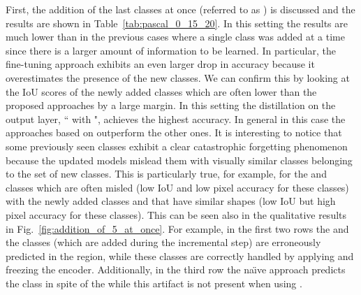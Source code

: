 \documentclass[10pt,twocolumn,letterpaper]{article}
\begin{document}
First, the addition of the last  classes at once (referred to as ) is discussed and the results are shown in Table~\ref{tab:pascal_0_15_20}. In this setting the results are much lower than in the previous cases where a single class was added at a time since there is a larger amount of information to be learned.
In particular, the fine-tuning approach exhibits an even larger drop in accuracy because it overestimates the presence of the new classes. We can confirm this by looking at the IoU scores of the newly added classes which are often lower than the proposed approaches by a large margin. In this setting the distillation on the output layer, `` with ", achieves the highest accuracy. In general in this case the approaches based on  outperform the other ones. It is interesting to notice that some previously seen classes exhibit a clear catastrophic forgetting phenomenon because the updated models mislead them with visually similar classes belonging to the set of new classes. This is particularly true, for example, for the  and  classes which are often misled (low IoU and low pixel accuracy for these classes) with the newly added classes  and  that have similar shapes (low IoU but high pixel accuracy for these classes). This can be seen also in the qualitative results  in Fig.~\ref{fig:addition_of_5_at_once}.
For example, in the first two rows the  and the  classes (which are added during the incremental step) are erroneously predicted in  the  region, while these classes are correctly handled by applying   and freezing the encoder. Additionally, in the third row the na\"\i ve approach predicts the  class in spite of the  while this artifact is not present when using .
\end{document}
